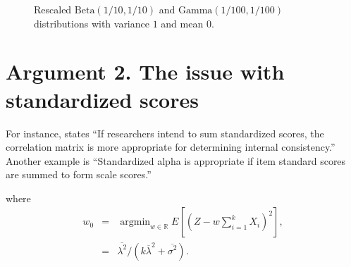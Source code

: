 \documentclass{article}
\theoremstyle{plain}
\theoremstyle{plain}
\theoremstyle{definition}
\theoremstyle{remark}
\theoremstyle{definition}
\theoremstyle{plain}
\theoremstyle{plain}
\theoremstyle{definition}
\DeclareMathOperator{\argmin}{argmin}
\begin{document}
\begin{figure}
	\centering     %
	\caption{Rescaled $\textrm{Beta}(1/10, 1/10)$ and $\textrm{Gamma}(1/100, 1/100)$ distributions with variance $1$ and mean $0$.}
	\label{fig::distributions}
\end{figure}



\section{Argument 2. The issue with standardized scores}
\label{sec:argument 2}
For instance, \citet[][p.451]{Falk2011-ae} states \enquote{If researchers intend to sum
standardized scores, the correlation matrix is more appropriate for determining internal consistency.} Another example is \citet[][p.99]{Cortina1993-aq} \enquote{Standardized alpha is appropriate if item standard scores are summed to form scale scores.}

where
\begin{eqnarray}
w_{0} & = & \argmin_{w\in\mathbb{R}}E\left[\left(Z-w\sum_{i=1}^{k}X_{i}\right)^{2}\right], \\
 & = & \overline{\lambda^{2}}/\left(k\overline{\lambda}^{2}+\overline{\sigma^{2}}\right).\label{eq:w0}
\end{eqnarray}
\end{document}
